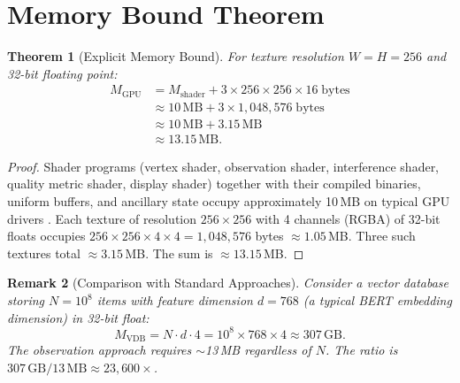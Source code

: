 \documentclass[11pt,twocolumn,a4paper]{article}
\newtheorem{theorem}{Theorem}[section]
\newtheorem{remark}[theorem]{Remark}
\newcommand{\Mgpu}{M_{\mathrm{GPU}}}
\newcommand{\Mshader}{M_{\mathrm{shader}}}
\begin{document}
\section{Memory Bound Theorem}
\label{sec:memory-bound}

\begin{theorem}[Explicit Memory Bound]
\label{thm:memory-bound}
For texture resolution $W = H = 256$ and 32-bit floating point:
\begin{align}
\Mgpu &= \Mshader + 3 \times 256 \times 256 \times 16
  \;\text{bytes} \nonumber\\
&\approx 10\,\text{MB} + 3 \times 1{,}048{,}576
  \;\text{bytes} \nonumber\\
&\approx 10\,\text{MB} + 3.15\,\text{MB} \nonumber\\
&\approx 13.15\,\text{MB}.
\label{eq:explicit-bound}
\end{align}
\end{theorem}

\begin{proof}
Shader programs (vertex shader, observation shader, interference
shader, quality metric shader, display shader) together with their
compiled binaries, uniform buffers, and ancillary state occupy
approximately 10\,MB on typical GPU drivers
\citep{khronosglsl,khronosvulkan}. Each texture of resolution
$256 \times 256$ with 4 channels (RGBA) of 32-bit floats occupies
$256 \times 256 \times 4 \times 4 = 1{,}048{,}576$ bytes
$\approx 1.05$\,MB. Three such textures total $\approx 3.15$\,MB.
The sum is $\approx 13.15$\,MB. \qedhere
\end{proof}

\begin{remark}[Comparison with Standard Approaches]
Consider a vector database storing $N = 10^8$ items with feature
dimension $d = 768$ (a typical BERT embedding dimension) in 32-bit
float:
\begin{equation}
M_{\mathrm{VDB}} = N \cdot d \cdot 4 = 10^8 \times 768 \times 4
  \approx 307\,\text{GB}.
\end{equation}
The observation approach requires $\sim$13\,MB regardless of $N$.
The ratio is $307\,\text{GB} / 13\,\text{MB} \approx 23{,}600\times$.
\end{remark}
\end{document}
